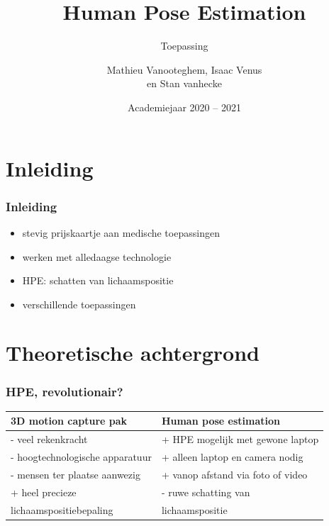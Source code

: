 \documentclass
   [kulak] %
   {kulakbeamer}
\title[HPE]{Human Pose Estimation}
\subtitle{Toepassing}
\author[Korte naam]{Mathieu Vanooteghem, Isaac Venus \\ 
	en Stan vanhecke}
\institute[Kulak]{KU Leuven Kulak}
\date{Academiejaar 2020 -- 2021}
\begin{document}
\begin{titleframe}
\titlepage
\end{titleframe}

\begin{outlineframe}[Overzicht]
\tableofcontents
\end{outlineframe}


\section{Inleiding}

\begin{frame}
\frametitle{Inleiding}
	\begin{itemize}
		\item stevig prijskaartje aan medische toepassingen
		\item werken met alledaagse technologie
		\item HPE: schatten van lichaamspositie
		\item verschillende toepassingen
	\end{itemize}
\end{frame}



\section[Korte titel]{Theoretische achtergrond}

\begin{frame}
\frametitle{HPE, revolutionair?}
\begin{center}
	\begin{tabular}{l|l} 
		\textbf{3D motion capture pak} & \textbf{Human pose estimation}\\
		\hline
		- veel rekenkracht & + HPE mogelijk met gewone laptop\\
		- hoogtechnologische apparatuur & + alleen laptop en camera nodig\\
		- mensen ter plaatse aanwezig & + vanop afstand via foto of video\\
		+ heel precieze & - ruwe schatting van \\
		  lichaamspositiebepaling & lichaamspositie\\
	\end{tabular}
\end{center}
\end{frame}
\end{document}
